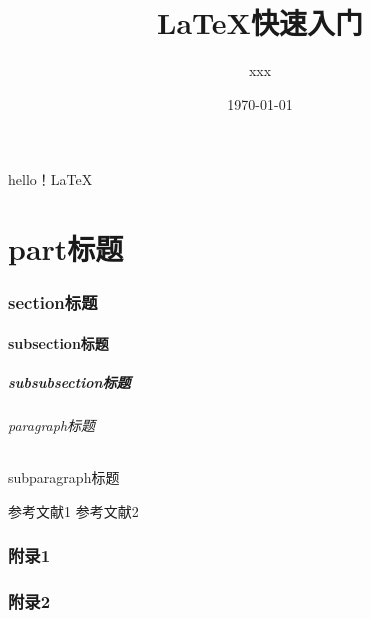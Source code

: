 \documentclass{article}
\title{LaTeX快速入门}
\author{xxx}
\date{\today}
\begin{document}
\maketitle
hello！LaTeX

\part{part标题}
\section{section标题}
\subsection{subsection标题}
\subsubsection{subsubsection标题}
\paragraph{paragraph标题}
\subparagraph{subparagraph标题}

\begin{thebibliography}{99}
 参考文献1
 参考文献2
\end{thebibliography}

\begin{appendix}
\section{附录1}
\section{附录2}
\end{appendix}
\end{document}
